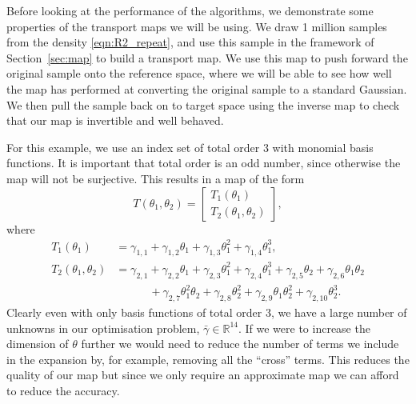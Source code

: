 \documentclass[final]{siamltex}
\begin{document}
Before looking at the performance of the algorithms, we demonstrate some properties of the transport maps we will be using. We draw 1 million samples from the density \eqref{eqn:R2_repeat}, and use this sample in the framework of Section~\ref{sec:map} to build a transport map. We use this map to push forward the original sample onto the reference space, where we will be able to see how well the map has performed at converting the original sample to a standard Gaussian. We then pull the sample back on to target space using the inverse map to check that our map is invertible and well behaved.

For this example, we use an index set of total order 3 with monomial
basis functions. It is important that total order is an odd number,
since otherwise the map will not be surjective. This results in a map of the form
\begin{equation}
	T(\theta_1, \theta_2) = \begin{bmatrix} T_1(\theta_1) \\ T_2(\theta_1, \theta_2) \end{bmatrix},
\end{equation}
where
\begin{align}
		T_1(\theta_1) &= \gamma_{1,1} + \gamma_{1,2}\theta_1 + \gamma_{1,3}\theta_1^2 + \gamma_{1,4}\theta_1^3, \\
		T_2(\theta_1, \theta_2) &= \gamma_{2,1} + \gamma_{2,2}\theta_1 + \gamma_{2,3}\theta_1^2 + \gamma_{2,4}\theta_1^3
					+ \gamma_{2,5}\theta_2 + \gamma_{2,6}\theta_1\theta_2 \\
				 & \qquad \quad + \gamma_{2,7}\theta_1^2\theta_2 + \gamma_{2,8}\theta_2^2 + \gamma_{2,9}\theta_1\theta_2^2 +
					 \gamma_{2,10}\theta_2^3.
\end{align}
Clearly even with only basis functions of total order 3, we have a large number of unknowns in our optimisation problem, $\bar{\gamma} \in \mathbb{R}^{14}$. If we were to increase the dimension of $\theta$ further we would need to reduce the number of terms we include in the expansion by, for example, removing all the ``cross'' terms. This reduces the quality of our map but since we only require an approximate map we can afford to reduce the accuracy.
\end{document}
